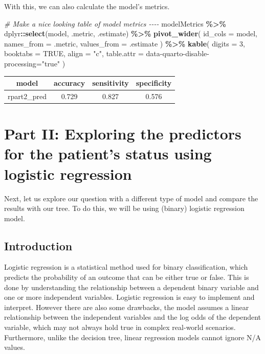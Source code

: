 \documentclass[
]{article}
\newenvironment{Shaded}{\begin{snugshade}}{\end{snugshade}}
\newcommand{\AttributeTok}[1]{\textcolor[rgb]{0.13,0.29,0.53}{#1}}
\newcommand{\CommentTok}[1]{\textcolor[rgb]{0.56,0.35,0.01}{\textit{#1}}}
\newcommand{\ConstantTok}[1]{\textcolor[rgb]{0.56,0.35,0.01}{#1}}
\newcommand{\DecValTok}[1]{\textcolor[rgb]{0.00,0.00,0.81}{#1}}
\newcommand{\FunctionTok}[1]{\textcolor[rgb]{0.13,0.29,0.53}{\textbf{#1}}}
\newcommand{\NormalTok}[1]{#1}
\newcommand{\SpecialCharTok}[1]{\textcolor[rgb]{0.81,0.36,0.00}{\textbf{#1}}}
\newcommand{\StringTok}[1]{\textcolor[rgb]{0.31,0.60,0.02}{#1}}
\begin{document}
With this, we can also calculate the model's metrics.

\begin{Shaded}
\begin{Highlighting}[]
\CommentTok{\# Make a nice looking table of model metrics {-}{-}{-}{-}}
\NormalTok{modelMetrics }\SpecialCharTok{\%\textgreater{}\%}
\NormalTok{  dplyr}\SpecialCharTok{::}\FunctionTok{select}\NormalTok{(model, .metric, .estimate) }\SpecialCharTok{\%\textgreater{}\%}
  \FunctionTok{pivot\_wider}\NormalTok{(}
    \AttributeTok{id\_cols =}\NormalTok{ model,}
    \AttributeTok{names\_from =}\NormalTok{ .metric,}
    \AttributeTok{values\_from =}\NormalTok{ .estimate}
\NormalTok{  ) }\SpecialCharTok{\%\textgreater{}\%}
  \FunctionTok{kable}\NormalTok{(}
    \AttributeTok{digits =} \DecValTok{3}\NormalTok{,}
    \AttributeTok{booktabs =} \ConstantTok{TRUE}\NormalTok{,}
    \AttributeTok{align =} \StringTok{"c"}\NormalTok{,}
    \AttributeTok{table.attr =} \StringTok{\textquotesingle{}data{-}quarto{-}disable{-}processing="true"\textquotesingle{}}
\NormalTok{  )}
\end{Highlighting}
\end{Shaded}

\begin{tabular}{cccc}
\toprule
model & accuracy & sensitivity & specificity\\
\midrule
rpart2\_pred & 0.729 & 0.827 & 0.576\\
\bottomrule
\end{tabular}

\hypertarget{part-ii-exploring-the-predictors-for-the-patients-status-using-logistic-regression}{%
\section{Part II: Exploring the predictors for the patient's status
using logistic
regression}\label{part-ii-exploring-the-predictors-for-the-patients-status-using-logistic-regression}}

Next, let us explore our question with a different type of model and
compare the results with our tree. To do this, we will be using (binary)
logistic regression model.

\hypertarget{introduction-1}{%
\subsection{Introduction}\label{introduction-1}}

Logistic regression is a statistical method used for binary
classification, which predicts the probability of an outcome that can be
either true or false. This is done by understanding the relationship
between a dependent binary variable and one or more independent
variables. Logistic regression is easy to implement and interpret.
However there are also some drawbacks, the model assumes a linear
relationship between the independent variables and the log odds of the
dependent variable, which may not always hold true in complex real-world
scenarios. Furthermore, unlike the decision tree, linear regression
models cannot ignore N/A values.
\end{document}
